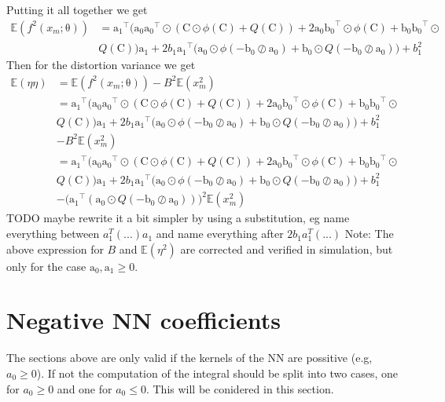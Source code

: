 \documentclass[12pt]{article}
\newcommand{\vect}[1]{\boldsymbol{\mathrm{#1}}}
\newcommand{\mat}[1]{\boldsymbol{\mathrm{#1}}}
\newcommand{\TODO}[1]{{\color{red} TODO {#1}}}
\newcommand{\note}[1]{{\color{blue} Note: {#1}}}
\newcommand{\expt}[1]{\mathbb{E}\left(#1\right)}
\theoremstyle{remark}
\begin{document}
Putting it all together we get 
\begin{align*}
	\expt{f^2(x_m; \vect{\theta})} &= \vect{a_1}^{\intercal} \Big(\vect{a_0} \vect{a_0}^{\intercal} \odot \left(\mat{C} \odot \phi(\mat{C}) + Q(\mat{C})\right) + 2 \vect{a_0}\vect{b_0}^{\intercal} \odot \phi(\mat{C}) + \vect{b_0}\vect{b_0}^{\intercal} \odot\\
	& Q(\mat{C})\Big)\vect{a_1} + 2b_1\vect{a_1}^{\intercal} \Big( \vect{a_0} \odot \phi(-\vect{b_0} \oslash \vect{a_0}) + \vect{b_0} \odot Q(-\vect{b_0} \oslash \vect{a_0}) \Big) + b_1^2
\end{align*}
Then for the distortion variance we get 
\begin{align*}
	\expt{\eta \eta} &= \expt{f^2(x_m; \vect{\theta})} - B^2\expt{x_m^2}\\
	&= \vect{a_1}^{\intercal} \Big(\vect{a_0} \vect{a_0}^{\intercal} \odot \left(\mat{C} \odot \phi(\mat{C}) + Q(\mat{C})\right) + 2 \vect{a_0}\vect{b_0}^{\intercal} \odot \phi(\mat{C}) + \vect{b_0}\vect{b_0}^{\intercal} \odot\\
	& Q(\mat{C})\Big)\vect{a_1} + 2b_1\vect{a_1}^{\intercal} \Big( \vect{a_0} \odot \phi(-\vect{b_0} \oslash \vect{a_0}) + \vect{b_0} \odot Q(-\vect{b_0} \oslash \vect{a_0}) \Big) + b_1^2 \\
	&- B^2\expt{x_m^2}\\
	&= \vect{a_1}^{\intercal} \Big(\vect{a_0} \vect{a_0}^{\intercal} \odot \left(\mat{C} \odot \phi(\mat{C}) + Q(\mat{C})\right) + 2 \vect{a_0}\vect{b_0}^{\intercal} \odot \phi(\mat{C}) + \vect{b_0}\vect{b_0}^{\intercal} \odot\\
	& Q(\mat{C})\Big)\vect{a_1} + 2b_1\vect{a_1}^{\intercal} \Big( \vect{a_0} \odot \phi(-\vect{b_0} \oslash \vect{a_0}) + \vect{b_0} \odot Q(-\vect{b_0} \oslash \vect{a_0}) \Big) + b_1^2 \\
	&- \Big(\vect{a_1}^{\intercal} \left(\vect{a_0} \odot Q(-\vect{b_0}\oslash\vect{a_0})\right)\Big)^2\expt{x_m^2}
\end{align*}
\TODO{maybe rewrite it a bit simpler by using a substitution, eg name everything between $a_1^T (...) a_1$ and name everything after $2b_1 a_1^T(...)$}
\note{The above expression for $B$ and $\expt{\eta^2}$ are corrected and verified in simulation, but only for the case $\vect{a_0}, \vect{a_1} \geq 0$.}

\section{Negative NN coefficients}
The sections above are only valid if the kernels of the NN are possitive (e.g, $a_0\geq 0$). If not the computation of the integral should be split into two cases, one for $a_0\geq0$ and one for $a_0\leq0$. This will be conidered in this section.
\end{document}
